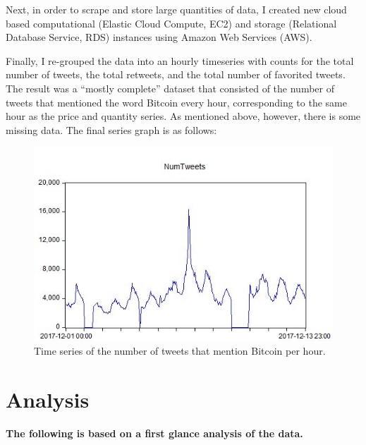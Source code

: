 \documentclass{article}
\begin{document}
	Next, in order to scrape and store large quantities of data, I created new cloud based computational (Elastic Cloud Compute, EC2) and storage (Relational Database Service, RDS) instances using Amazon Web Services (AWS).
	
	Finally, I re-grouped the data into an hourly timeseries with counts for the total number of tweets, the total retweets, and the total number of favorited tweets. The result was a ``mostly complete'' dataset that consisted of the number of tweets that mentioned the word Bitcoin every hour, corresponding to the same hour as the price and quantity series. As mentioned above, however, there is some missing data. The final series graph is as follows: 
	
	\begin{figure}[H]
	\centering
	\includegraphics[width = .9\textwidth]{numTweets.JPG}
	\caption{Time series of the number of tweets that mention Bitcoin per hour.}
	\end{figure}
	
	\section{Analysis}
	\textbf{The following is based on a first glance analysis of the data.}
	
\end{document}
